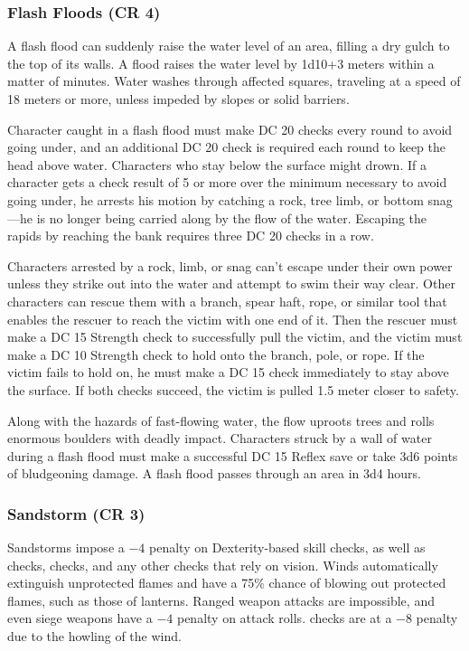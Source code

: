 \subsubsection{Flash Floods (CR 4)}
A flash flood can suddenly raise the water level of an area, filling a dry gulch to the top of its walls. A flood raises the water level by 1d10+3 meters within a matter of minutes. Water washes through affected squares, traveling at a speed of 18 meters or more, unless impeded by slopes or solid barriers.

Character caught in a flash flood must make DC 20  checks every round to avoid going under, and an additional DC 20  check is required each round to keep the head above water. Characters who stay below the surface might drown. If a character gets a check result of 5 or more over the minimum necessary to avoid going under, he arrests his motion by catching a rock, tree limb, or bottom snag---he is no longer being carried along by the flow of the water. Escaping the rapids by reaching the bank requires three DC 20  checks in a row. 

Characters arrested by a rock, limb, or snag can't escape under their own power unless they strike out into the water and attempt to swim their way clear. Other characters can rescue them with a branch, spear haft, rope, or similar tool that enables the rescuer to reach the victim with one end of it. Then the rescuer must make a DC 15 Strength check to successfully pull the victim, and the victim must make a DC 10 Strength check to hold onto the branch, pole, or rope. If the victim fails to hold on, he must make a DC 15  check immediately to stay above the surface. If both checks succeed, the victim is pulled 1.5 meter closer to safety.

Along with the hazards of fast-flowing water, the flow uproots trees and rolls enormous boulders with deadly impact. Characters struck by a wall of water during a flash flood must make a successful DC 15 Reflex save or take 3d6 points of bludgeoning damage. A flash flood passes through an area in 3d4 hours.

\subsubsection{Sandstorm (CR 3)}
Sandstorms impose a $-4$ penalty on Dexterity-based skill checks, as well as  checks,  checks, and any other checks that rely on vision. Winds automatically extinguish unprotected flames and have a 75\% chance of blowing out protected flames, such as those of lanterns. Ranged weapon attacks are impossible, and even siege weapons have a $-4$ penalty on attack rolls.  checks are at a $-8$ penalty due to the howling of the wind.

